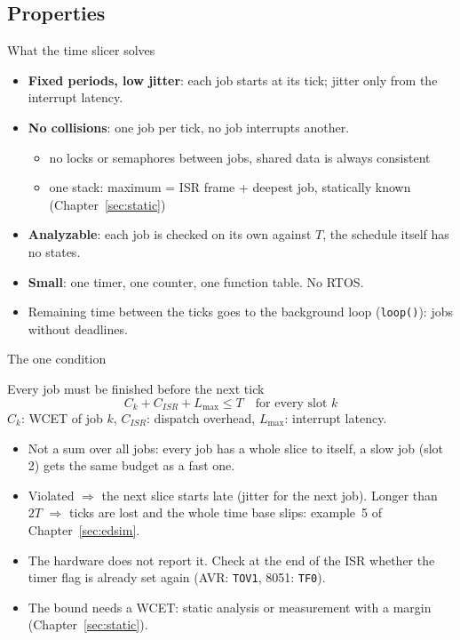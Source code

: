 \subsection{Properties}
\begin{frame}{What the time slicer solves}
  \begin{itemize}
    \item \textbf{Fixed periods, low jitter}: each job starts at its tick; jitter only from the interrupt latency.
    \item \textbf{No collisions}: one job per tick, no job interrupts another.
      \begin{itemize}
        \item no locks or semaphores between jobs, shared data is always consistent
        \item one stack: maximum = ISR frame + deepest job, statically known (Chapter~\ref{sec:static})
      \end{itemize}
    \item \textbf{Analyzable}: each job is checked on its own against $T$, the schedule itself has no states.
    \item \textbf{Small}: one timer, one counter, one function table. No RTOS.
    \item Remaining time between the ticks goes to the background loop (\texttt{loop()}): jobs without deadlines.
  \end{itemize}
\end{frame}

\begin{frame}{The one condition}
  \begin{block}{Every job must be finished before the next tick}
    \[ C_k + C_{\mathit{ISR}} + L_{\max} \le T \quad \text{for every slot } k \]
    $C_k$: WCET of job $k$, $C_{\mathit{ISR}}$: dispatch overhead, $L_{\max}$: interrupt latency.
  \end{block}
  \begin{itemize}
    \item Not a sum over all jobs: every job has a whole slice to itself, a slow job (slot 2) gets the same budget as a fast one.
    \item Violated $\Rightarrow$ the next slice starts late (jitter for the next job). Longer than $2T$ $\Rightarrow$ ticks are lost and the whole time base slips: example~5 of Chapter~\ref{sec:edsim}.
    \item The hardware does not report it. Check at the end of the ISR whether the timer flag is already set again (AVR: \texttt{TOV1}, 8051: \texttt{TF0}).
    \item The bound needs a WCET: static analysis or measurement with a margin (Chapter~\ref{sec:static}).
  \end{itemize}
\end{frame}

